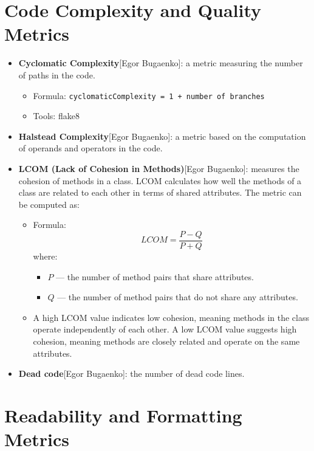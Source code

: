 \documentclass{article}
\begin{document}
\section{Code Complexity and Quality Metrics}

\begin{itemize}
    \item \textbf{Cyclomatic Complexity}[Egor Bugaenko]: a metric measuring the number of paths in the code. 
    \begin{itemize}
        \item Formula: \texttt{cyclomaticComplexity = 1 + number of branches}
        \item Tools: flake8
    \end{itemize}
    \item \textbf{Halstead Complexity}[Egor Bugaenko]: a metric based on the computation of operands and operators in the code.
    \item \textbf{LCOM (Lack of Cohesion in Methods)}[Egor Bugaenko]: measures the cohesion of methods in a class. LCOM calculates how well the methods of a class are related to each other in terms of shared attributes. The metric can be computed as:
    \begin{itemize}
        \item Formula: 
        \[
        LCOM = \frac{P - Q}{P + Q}
        \]
        where:
        \begin{itemize}
            \item \( P \) — the number of method pairs that share attributes.
            \item \( Q \) — the number of method pairs that do not share any attributes.
        \end{itemize}
        \item A high LCOM value indicates low cohesion, meaning methods in the class operate independently of each other. A low LCOM value suggests high cohesion, meaning methods are closely related and operate on the same attributes.
    \end{itemize}
    \item \textbf{Dead code}[Egor Bugaenko]: the number of dead code lines.
\end{itemize}

\section{Readability and Formatting Metrics}
\end{document}
